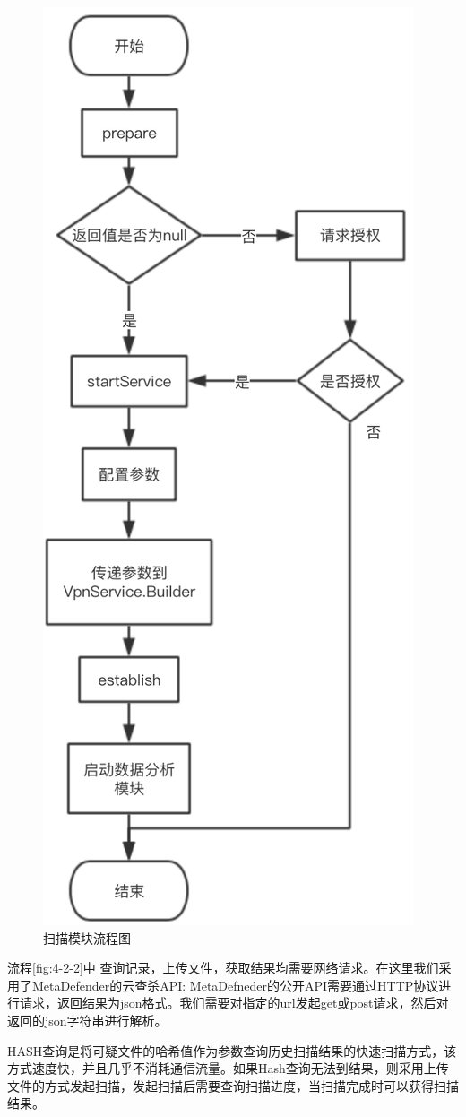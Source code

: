 \documentclass[format=final, language=chinese, degree=fyp]{hustthesis}
\begin{document}
\begin{figure}[!h]
	\centering
	\includegraphics[width=.6\textwidth]{process_4_2_scan.png}
	\caption{扫描模块流程图}\label{fig:4-2-2}
\end{figure}

流程\autoref{fig:4-2-2}中 查询记录，上传文件，获取结果均需要网络请求。在这里我们采用了MetaDefender的云查杀API:
MetaDefneder的公开API需要通过HTTP协议进行请求，返回结果为json格式。我们需要对指定的url发起get或post请求，然后对返回的json字符串进行解析。

HASH查询是将可疑文件的哈希值作为参数查询历史扫描结果的快速扫描方式，该方式速度快，并且几乎不消耗通信流量。如果Hash查询无法到结果，则采用上传文件的方式发起扫描，发起扫描后需要查询扫描进度，当扫描完成时可以获得扫描结果。
\end{document}
